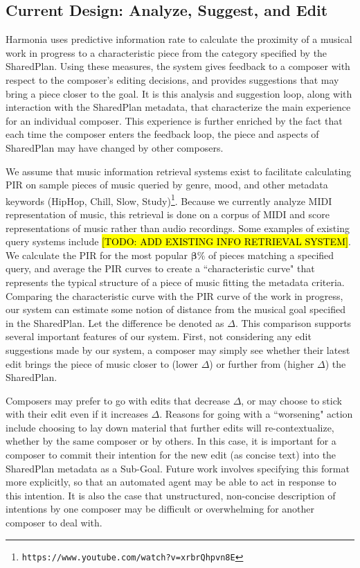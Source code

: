 \documentclass[final,authoryear,5p,times,twocolumn]{elsarticle}
\begin{document}
\subsection{Current Design: Analyze, Suggest, and Edit}

Harmonia uses predictive information rate to calculate the proximity of a musical work in progress to a characteristic piece from the category specified by the SharedPlan. Using these measures, the system gives feedback to a composer with respect to the composer's editing decisions, and provides suggestions that may bring a piece closer to the goal. It is this analysis and suggestion loop, along with interaction with the SharedPlan metadata, that characterize the main experience for an individual composer. This experience is further enriched by the fact that each time the composer enters the feedback loop, the piece and aspects of SharedPlan may have changed by other composers.

We assume that music information retrieval systems exist to facilitate calculating PIR on sample pieces of music queried by genre, mood, and other metadata keywords (HipHop, Chill, Slow, Study)\footnote{\texttt{https://www.youtube.com/watch?v=xrbrQhpvn8E}}. Because we currently analyze MIDI representation of music, this retrieval is done on a corpus of MIDI and score representations of music rather than audio recordings. Some examples of existing query systems include \hl{[TODO: ADD EXISTING INFO RETRIEVAL SYSTEM]}. We calculate the PIR for the most popular $\boldsymbol{\beta}\%$ of pieces matching a specified query, and average the PIR curves to create a ``characteristic curve" that represents the typical structure of a piece of music fitting the metadata criteria. 
Comparing the characteristic curve with the PIR curve of the work in progress, our system can estimate some notion of distance from the musical goal specified in the SharedPlan. Let the difference be denoted as $\Delta$. This comparison supports several important features of our system. First, not considering any edit suggestions made by our system, a composer may simply see whether their latest edit brings the piece of music closer to (lower $\Delta$) or further from (higher $\Delta$) the SharedPlan.  

Composers may prefer to go with edits that decrease $\Delta$, or may choose to stick with their edit even if it increases $\Delta$. Reasons for going with a ``worsening" action include choosing to lay down material that further edits will re-contextualize, whether by the same composer or by others. In this case, it is important for a composer to commit their intention for the new edit (as concise text) into the SharedPlan metadata as a Sub-Goal. Future work involves specifying this format more explicitly, so that an automated agent may be able to act in response to this intention. It is also the case that unstructured, non-concise description of intentions by one composer may be difficult or overwhelming for another composer to deal with.
\end{document}
